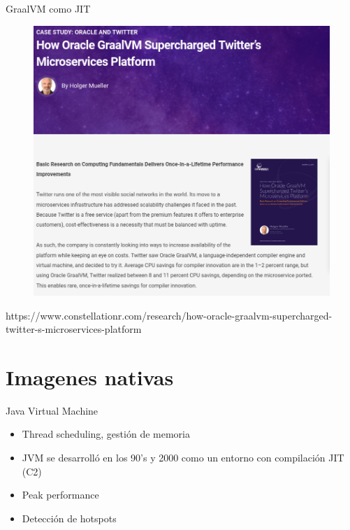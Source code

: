 \documentclass[aspectratio=169]{beamer}
\begin{document}
\begin{frame}{GraalVM como JIT}
	\begin{figure}
		\centering
		\includegraphics[width=0.5\linewidth]{Images/twittergraalvm}
	\end{figure}
{\tiny 
https://www.constellationr.com/research/how-oracle-graalvm-supercharged-twitter-s-microservices-platform
}
\end{frame}

{
	\section{Imagenes nativas}
}



\begin{frame}{Java Virtual Machine}
	
	\begin{itemize}
		\item Thread scheduling, gestión de memoria
		\item JVM se desarrolló en los 90's y 2000 como un entorno con compilación JIT (C2)
		\item Peak performance 
		\item Detección de hotspots
	\end{itemize}
	
\end{frame}
\end{document}
